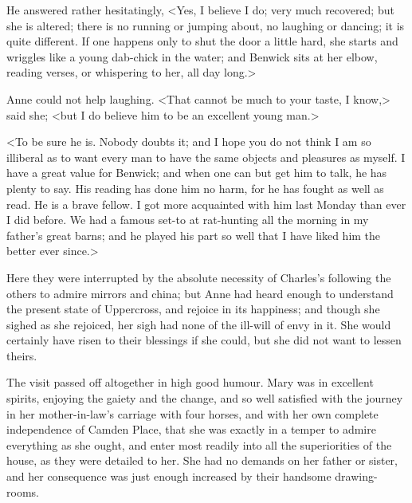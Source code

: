 He answered rather hesitatingly, <Yes, I believe I do; very much recovered; but she is altered; there is no running or jumping about, no laughing or dancing; it is quite different. If one happens only to shut the door a little hard, she starts and wriggles like a young dab-chick in the water; and Benwick sits at her elbow, reading verses, or whispering to her, all day long.>

Anne could not help laughing. <That cannot be much to your taste, I know,> said she; <but I do believe him to be an excellent young man.>

<To be sure he is. Nobody doubts it; and I hope you do not think I am so illiberal as to want every man to have the same objects and pleasures as myself. I have a great value for Benwick; and when one can but get him to talk, he has plenty to say. His reading has done him no harm, for he has fought as well as read. He is a brave fellow. I got more acquainted with him last Monday than ever I did before. We had a famous set-to at rat-hunting all the morning in my father's great barns; and he played his part so well that I have liked him the better ever since.>

Here they were interrupted by the absolute necessity of Charles's following the others to admire mirrors and china; but Anne had heard enough to understand the present state of Uppercross, and rejoice in its happiness; and though she sighed as she rejoiced, her sigh had none of the ill-will of envy in it. She would certainly have risen to their blessings if she could, but she did not want to lessen theirs.

The visit passed off altogether in high good humour. Mary was in excellent spirits, enjoying the gaiety and the change, and so well satisfied with the journey in her mother-in-law's carriage with four horses, and with her own complete independence of Camden Place, that she was exactly in a temper to admire everything as she ought, and enter most readily into all the superiorities of the house, as they were detailed to her. She had no demands on her father or sister, and her consequence was just enough increased by their handsome drawing-rooms.

